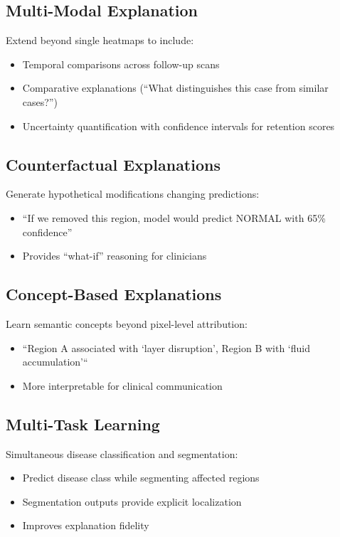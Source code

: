 \documentclass[12pt,a4paper,oneside]{book}
\begin{document}
\subsection{Multi-Modal Explanation}

Extend beyond single heatmaps to include:
\begin{itemize}
  \item Temporal comparisons across follow-up scans
  \item Comparative explanations (``What distinguishes this case from similar cases?'')
  \item Uncertainty quantification with confidence intervals for retention scores
\end{itemize}

\subsection{Counterfactual Explanations}

Generate hypothetical modifications changing predictions:
\begin{itemize}
  \item ``If we removed this region, model would predict NORMAL with 65\% confidence''
  \item Provides ``what-if'' reasoning for clinicians
\end{itemize}

\subsection{Concept-Based Explanations}

Learn semantic concepts beyond pixel-level attribution:
\begin{itemize}
  \item ``Region A associated with `layer disruption', Region B with `fluid accumulation'``
  \item More interpretable for clinical communication
\end{itemize}

\subsection{Multi-Task Learning}

Simultaneous disease classification and segmentation:
\begin{itemize}
  \item Predict disease class while segmenting affected regions
  \item Segmentation outputs provide explicit localization
  \item Improves explanation fidelity
\end{itemize}
\end{document}
